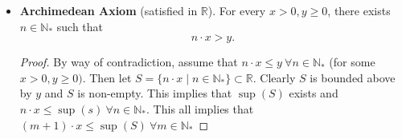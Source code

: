 \documentclass{article}
\newcommand{\R}{\mathbb{R}}
\newcommand{\N}{\mathbb{N}}
\newcommand{\set}[2]{\{ #1 \mid #2 \}}
\newcommand{\?}{\stackrel{?}{=}}
\begin{document}
\begin{itemize}
\begin{proof}
        So, by Axiom 3, there is a real number $a$ such that
        \begin{enumerate}[label=(\arabic*)]
            \item If $z \in \overline{X}$, then $a \leq z$ (i.e., $a$ is a lower bound for $\overline{X}$) and
            \item For every $\varepsilon > 0$, there exists a $z_\varepsilon \in \overline{X}$ such that
            $$z_\varepsilon - a \leq \varepsilon.$$
        \end{enumerate}
        \textbf{Claim}. $b_1 = b + 1 - a$ is the supremum for $X$. \\\\
        There are two things to check:
        \begin{enumerate}[label=(\arabic*)]
            \item Is $b_1$ an upper bound for $X$? Well, if $y \in X$, then $a \leq b + 1 - y$ and we have $y \leq b + 1 - a = b_1$.
            \item Is $b_1$ the least upper bound? \\\\
            Let $M$ be some upper bound for $X$. Let us show that $b_1 \leq M$. By way of contradiction, assume that $M < b_1 = b + 1 - a$. Let $\varepsilon = b_1 - M > 0$. \\\\
            By Axiom 3, there exists some $z \in \overline{X}$ such that $z - a \leq \varepsilon$. We have
            $$z = b + 1 - y, y \in X, \qquad \varepsilon = b_1 - M = b + 1 - a - M.$$
            So, supposedly $z - a = b + 1 - y - a \leq b + 1 - a - M$ with $M \leq y$ (this is a contradiction since $M$ is assumed to be an upper bound, it cannot be smaller than $y$) and therefore $b_1 \leq M$ and $b_1 = \sup(X)$.
        \end{enumerate}
    \end{proof}
    \item \textbf{Archimedean Axiom} (satisfied in $\R$). For every $x > 0, y \geq 0$, there exists $n \in \N_*$ such that
    $$n \cdot x > y.$$
    \begin{proof}
        By way of contradiction, assume that $n \cdot x \leq y \ \forall n \in \N_*$ (for some $x > 0, y \geq 0)$. Then let $S = \set{n \cdot x}{n \in \N_*} \subset \R$. Clearly $S$ is bounded above by $y$ and $S$ is non-empty. This implies that $\sup(S)$ exists and $n \cdot x \leq \sup(s) \ \forall n \in \N_*$. This all implies that $(m + 1) \cdot x \leq \sup(S) \ \forall m \in \N_*$

\end{proof}
\end{itemize}
\end{document}
